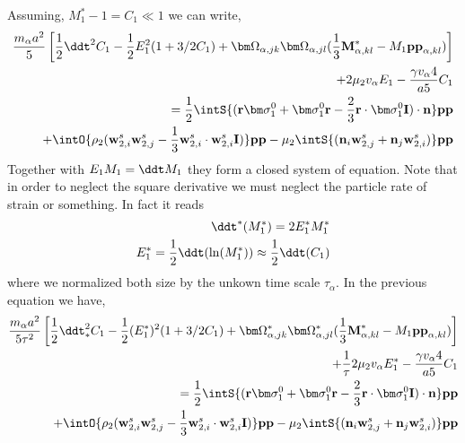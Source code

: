Assuming, $M_1^* - 1 = C_1 \ll 1$ we can write, 
\begin{align*}
    \frac{m_\alpha a^2}{5}  \left[\frac{1}{2}\ddt^2 C_1
    - \frac{1}{2}E_1^2  ( 1 + 3/2  C_1 ) 
    +  
    \bm\Omega_{\alpha,jk}
    \bm\Omega_{\alpha,jl}(
        \frac{1}{3}\textbf{M}^*_{\alpha,kl} - M_1 \textbf{pp}_{\alpha,kl}
    )
    \right]\\
    + 2 \mu_2 v_\alpha E_1
    - \frac{\gamma v_\alpha 4 }{a5 } C_1
    \\ 
    = 
    \frac{1}{2}\intS{(\textbf{r}\bm\sigma_1^0 + \bm\sigma_1^0\textbf{r} - \frac{2}{3}\textbf{r}\cdot \bm\sigma_1^0 \textbf{I})\cdot \textbf{n}} \textbf{pp}\\
    + \intO{\rho_2 (\textbf{w}_{2,i}^s\textbf{w}_{2,j}^s - \frac{1}{3}\textbf{w}_{2,i}^s\cdot \textbf{w}_{2,i}^s \textbf{I})} \textbf{pp}
    - \mu_2 \intS{(\textbf{n}_i \textbf{w}_{2,j}^s + \textbf{n}_j \textbf{w}_{2,i}^s)} \textbf{pp}\\
\end{align*}
Together with $E_1 M_1 = \ddt M_1$ they form a closed system of equation. 
Note that in order to neglect the square derivative we must neglect the particle rate of strain or something. 
In fact it reads 
\begin{align*}
    \ddt^*  (M_1^*) = 2E_1^* M_1^*\\
    E_1^* = \frac{1}{2}\ddt (\ln(M_1^*))\approx \frac{1}{2}\ddt (C_1)
\end{align*}
where we normalized both size by the unkown time scale $\tau_\alpha$. 
In the previous equation we have, 
\begin{align*}
    \frac{m_\alpha a^2}{5\tau^2}  \left[\frac{1}{2}\ddt^2_* C_1
    - \frac{1}{2}(E_1^*)^2  ( 1 + 3/2  C_1 ) 
    +  
    \bm\Omega_{\alpha,jk}^*
    \bm\Omega_{\alpha,jl}^*(
        \frac{1}{3}\textbf{M}^*_{\alpha,kl} - M_1 \textbf{pp}_{\alpha,kl}
    )
    \right]\\
    + \frac{1}{\tau}2 \mu_2 v_\alpha E_1^*
    - \frac{\gamma v_\alpha 4 }{a5 } C_1
    \\ 
    = 
    \frac{1}{2}\intS{(\textbf{r}\bm\sigma_1^0 + \bm\sigma_1^0\textbf{r} - \frac{2}{3}\textbf{r}\cdot \bm\sigma_1^0 \textbf{I})\cdot \textbf{n}} \textbf{pp}\\
    + \intO{\rho_2 (\textbf{w}_{2,i}^s\textbf{w}_{2,j}^s - \frac{1}{3}\textbf{w}_{2,i}^s\cdot \textbf{w}_{2,i}^s \textbf{I})} \textbf{pp}
    - \mu_2 \intS{(\textbf{n}_i \textbf{w}_{2,j}^s + \textbf{n}_j \textbf{w}_{2,i}^s)} \textbf{pp}\\
\end{align*}

